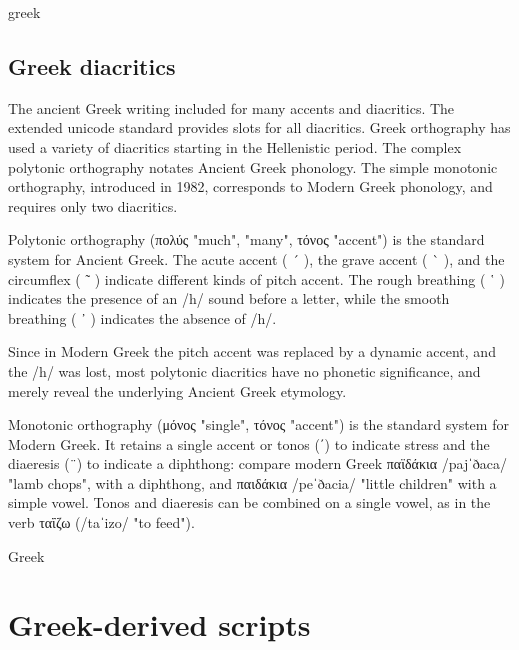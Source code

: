 \begin{scriptexample}{greek}
\end{scriptexample}

\subsection{Greek diacritics}

The ancient Greek writing included for many accents and diacritics. The extended unicode standard provides slots for all diacritics. Greek orthography has used a variety of diacritics starting in the Hellenistic period. The complex polytonic orthography notates Ancient Greek phonology. The simple monotonic orthography, introduced in 1982, corresponds to Modern Greek phonology, and requires only two diacritics.

Polytonic orthography (πολύς "much", "many", τόνος "accent") is the standard system for Ancient Greek. The acute accent ( ´ ), the grave accent ( ` ), and the circumflex ( ῀ ) indicate different kinds of pitch accent. The rough breathing ( ῾ ) indicates the presence of an /h/ sound before a letter, while the smooth breathing ( ᾿ ) indicates the absence of /h/.

Since in Modern Greek the pitch accent was replaced by a dynamic accent, and the /h/ was lost, most polytonic diacritics have no phonetic significance, and merely reveal the underlying Ancient Greek etymology.

Monotonic orthography (μόνος "single", τόνος "accent") is the standard system for Modern Greek. It retains a single accent or tonos (΄) to indicate stress and the diaeresis (¨) to indicate a diphthong: compare modern Greek παϊδάκια /pajˈðaca/ "lamb chops", with a diphthong, and παιδάκια /peˈðacia/ "little children" with a simple vowel. Tonos and diaeresis can be combined on a single vowel, as in the verb ταΐζω (/taˈizo/ "to feed").

\medskip
\begin{scriptexample}[]{Greek}
\end{scriptexample}




\section{Greek-derived scripts}

